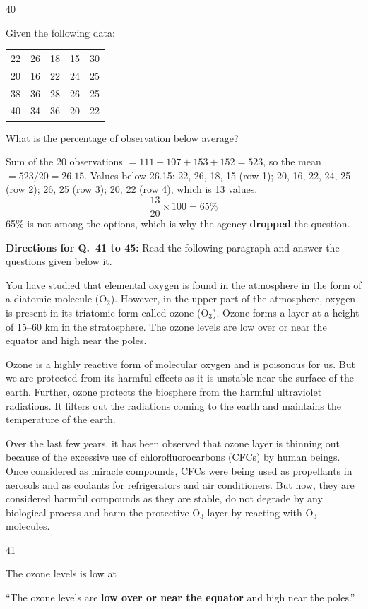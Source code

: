 \begin{question}{40}
{Given the following data:
\begin{center}
\begin{tabular}{ccccc}
22 & 26 & 18 & 15 & 30\\ 20 & 16 & 22 & 24 & 25\\ 38 & 36 & 28 & 26 & 25\\ 40 & 34 & 36 & 20 & 22\\
\end{tabular}
\end{center}
What is the percentage of observation below average?\par}
\dropped{}
\begin{explain}
Sum of the 20 observations $=111+107+153+152=523$, so the mean $=523/20=26.15$.
Values below 26.15: 22, 26, 18, 15 (row 1); 20, 16, 22, 24, 25 (row 2); 26, 25 (row 3); 20, 22 (row 4), which is 13 values.
\[\frac{13}{20}\times100=65\%\]
65\% is not among the options, which is why the agency \textbf{dropped} the question.
\end{explain}
\end{question}

\begin{context}
\textbf{Directions for Q.~41 to 45:} Read the following paragraph and answer the questions given below it.\par\smallskip
You have studied that elemental oxygen is found in the atmosphere in the form of a diatomic molecule (O$_2$). However, in the upper part of the atmosphere, oxygen is present in its triatomic form called ozone (O$_3$). Ozone forms a layer at a height of 15--60 km in the stratosphere. The ozone levels are low over or near the equator and high near the poles.

Ozone is a highly reactive form of molecular oxygen and is poisonous for us. But we are protected from its harmful effects as it is unstable near the surface of the earth. Further, ozone protects the biosphere from the harmful ultraviolet radiations. It filters out the radiations coming to the earth and maintains the temperature of the earth.

Over the last few years, it has been observed that ozone layer is thinning out because of the excessive use of chlorofluorocarbons (CFCs) by human beings. Once considered as miracle compounds, CFCs were being used as propellants in aerosols and as coolants for refrigerators and air conditioners. But now, they are considered harmful compounds as they are stable, do not degrade by any biological process and harm the protective O$_3$ layer by reacting with O$_3$ molecules.
\end{context}
\begin{question}{41}
{The ozone levels is low at\par}
\begin{explain}
``The ozone levels are \textbf{low over or near the equator} and high near the poles.''
\end{explain}
\end{question}


